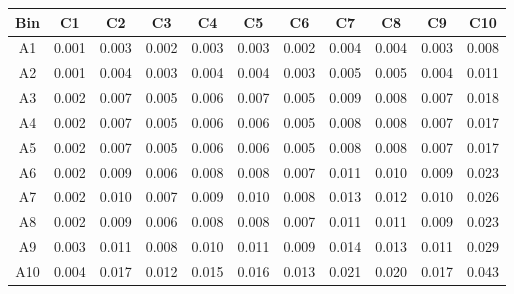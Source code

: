 \begin{tabular}{c@{~~~}c@{~~}c@{~~}c@{~~}c@{~~}c@{~~}c@{~~}c@{~~}c@{~~}c@{~~}c}
\hline
 \hline
Bin	& C1 & C2 & C3 & C4 & C5 & C6 & C7 & C8 & C9 & C10 \\
\hline
A1	&  0.001 &  0.003 &  0.002 &  0.003 &  0.003 &  0.002 &  0.004 &  0.004 &  0.003 &  0.008 \\
A2	&  0.001 &  0.004 &  0.003 &  0.004 &  0.004 &  0.003 &  0.005 &  0.005 &  0.004 &  0.011 \\
A3	&  0.002 &  0.007 &  0.005 &  0.006 &  0.007 &  0.005 &  0.009 &  0.008 &  0.007 &  0.018 \\
A4	&  0.002 &  0.007 &  0.005 &  0.006 &  0.006 &  0.005 &  0.008 &  0.008 &  0.007 &  0.017 \\
A5	&  0.002 &  0.007 &  0.005 &  0.006 &  0.006 &  0.005 &  0.008 &  0.008 &  0.007 &  0.017 \\
A6	&  0.002 &  0.009 &  0.006 &  0.008 &  0.008 &  0.007 &  0.011 &  0.010 &  0.009 &  0.023 \\
A7	&  0.002 &  0.010 &  0.007 &  0.009 &  0.010 &  0.008 &  0.013 &  0.012 &  0.010 &  0.026 \\
A8	&  0.002 &  0.009 &  0.006 &  0.008 &  0.008 &  0.007 &  0.011 &  0.011 &  0.009 &  0.023 \\
A9	&  0.003 &  0.011 &  0.008 &  0.010 &  0.011 &  0.009 &  0.014 &  0.013 &  0.011 &  0.029 \\
A10	&  0.004 &  0.017 &  0.012 &  0.015 &  0.016 &  0.013 &  0.021 &  0.020 &  0.017 &  0.043 \\
\hline
 \hline
\end{tabular}
